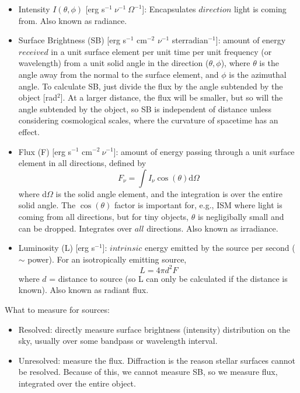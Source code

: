 \documentclass[12pt]{article}
\begin{document}
\begin{itemize}
    \item Intensity $I(\theta,\phi)$ [erg s$^{-1}\ \nu^{-1}\ \Omega^{-1}$]:
        Encapsulates $direction$ light is coming from.
        Also known as radiance.
    \item Surface Brightness (SB)
        [erg s$^{-1}$ cm$^{-2}$ $\nu^{-1}$ sterradian$^{-1}$]:
        amount of energy $received$ in a unit surface
        element per unit time per unit frequency (or wavelength)
        from a unit
        solid angle in the direction ($\theta,\phi$), where $\theta$
        is the angle
        away from the normal to the surface element, and $\phi$ is the
        azimuthal angle.
        To calculate SB, just divide the flux by the angle subtended
        by the object [rad$^2$]. At a larger distance, the flux will
        be smaller, but so will the angle subtended by the object, so
        SB is independent of distance unless considering cosmological
        scales, where the curvature of spacetime has an effect.
    \item Flux (F) [erg s$^{-1}$ cm$^{-2}\ \nu^{-1}$]:
        amount of energy passing through a unit surface element
        in all directions, defined by
        \begin{equation}
            F_{\nu} = \int I_{\nu}\cos(\theta)\textrm{d}\Omega
        \end{equation}
        where d$\Omega$ is the solid angle element, and the integration is
        over the entire solid angle. The $\cos(\theta)$ factor is important
        for, e.g., ISM where light is coming from all directions, but for
        tiny objects, $\theta$ is negligibally small and can be dropped.
        Integrates over $all$ directions.
        Also known as irradiance.
    \item Luminosity (L) [erg s$^{-1}$]:
        $intrinsic$ energy emitted by the source per
        second ($\sim$ power). For an isotropically emitting source,
        \begin{equation}
            L = 4 \pi d^2 F
        \end{equation}
        where $d$ = distance to source (so L can only be calculated if
        the distance is known). Also known as radiant flux.
\end{itemize}
What to measure for sources:
\begin{itemize}
    \item Resolved: directly measure surface brightness (intensity)
        distribution on the sky, usually over some bandpass or wavelength
        interval.
    \item Unresolved: measure the flux. Diffraction is the reason stellar
        surfaces cannot be resolved. Because of this, we cannot measure
        SB, so we measure flux, integrated over the entire object.
\end{itemize}
\end{document}
